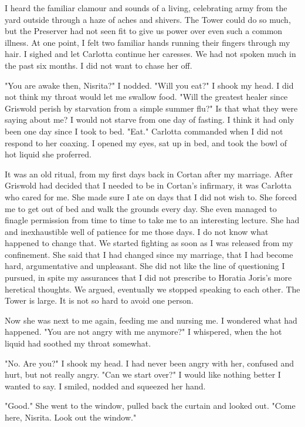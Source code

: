 \documentclass{article}
\begin{document}
I heard the familiar clamour and sounds of a living, celebrating army from the yard outside through a haze of aches and shivers. The Tower could do so much, but the Preserver had not seen fit to give us power over even such a common illness. At one point, I felt two familiar hands running their fingers through my hair. I sighed and let Carlotta continue her caresses. We had not spoken much in the past six months. I did not want to chase her off. 

"You are awake then, Nisrita?" I nodded. "Will you eat?" I shook my head. I did not think my throat would let me swallow food. "Will the greatest healer since Griswold perish by starvation from a simple summer flu?" Is that what they were saying about me? I would not starve from one day of fasting. I think it had only been one day since I took to bed. "Eat." Carlotta commanded when I did not respond to her coaxing. I opened my eyes, sat up in bed, and took the bowl of hot liquid she proferred.

It was an old ritual, from my first days back in Cortan after my marriage. After Griswold had decided that I needed to be in Cortan's infirmary, it was Carlotta who cared for me. She made sure I ate on days that I did not wish to. She forced me to get out of bed and walk the grounds every day. She even managed to finagle permission from time to time to take me to an interesting lecture. She had and inexhaustible well of patience for me those days. I do not know what happened to change that. We started fighting as soon as I was released from my confinement. She said that I had changed since my marriage, that I had become hard, argumentative and unpleasant. She did not like the line of questioning I pursued, in spite my assurances that I did not prescribe to Horatia Joris's more heretical thoughts. We argued, eventually we stopped speaking to each other. The Tower is large. It is not so hard to avoid one person.

Now she was next to me again, feeding me and nursing me. I wondered what had happened. "You are not angry with me anymore?" I whispered, when the hot liquid had soothed my throat somewhat. 

"No. Are you?" I shook my head. I had never been angry with her, confused and hurt, but not really angry. "Can we start over?" I would like nothing better I wanted to say. I smiled, nodded and squeezed her hand.

"Good." She went to the window, pulled back the curtain and looked out. "Come here, Nisrita. Look out the window."
\end{document}

